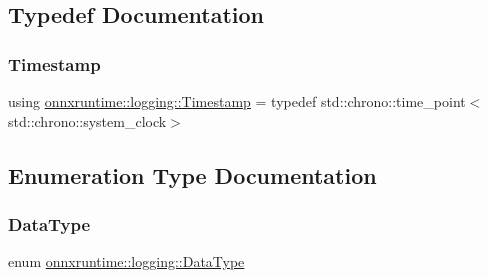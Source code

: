 \subsection{Typedef Documentation}
\mbox{\label{namespaceonnxruntime_1_1logging_ae7a2a84f622a028e2ad495a74289012d}} 
\subsubsection{\texorpdfstring{Timestamp}{Timestamp}}
{\footnotesize\ttfamily using \mbox{\hyperlink{namespaceonnxruntime_1_1logging_ae7a2a84f622a028e2ad495a74289012d}{onnxruntime\+::logging\+::\+Timestamp}} = typedef std\+::chrono\+::time\+\_\+point$<$std\+::chrono\+::system\+\_\+clock$>$}



\subsection{Enumeration Type Documentation}
\mbox{\label{namespaceonnxruntime_1_1logging_a7342198e47b8ad2717a5d6e28cf68951}} 
\subsubsection{\texorpdfstring{Data\+Type}{DataType}}
{\footnotesize\ttfamily enum \mbox{\hyperlink{namespaceonnxruntime_1_1logging_a7342198e47b8ad2717a5d6e28cf68951}{onnxruntime\+::logging\+::\+Data\+Type}}\hspace{0.3cm}{\ttfamily [strong]}}

